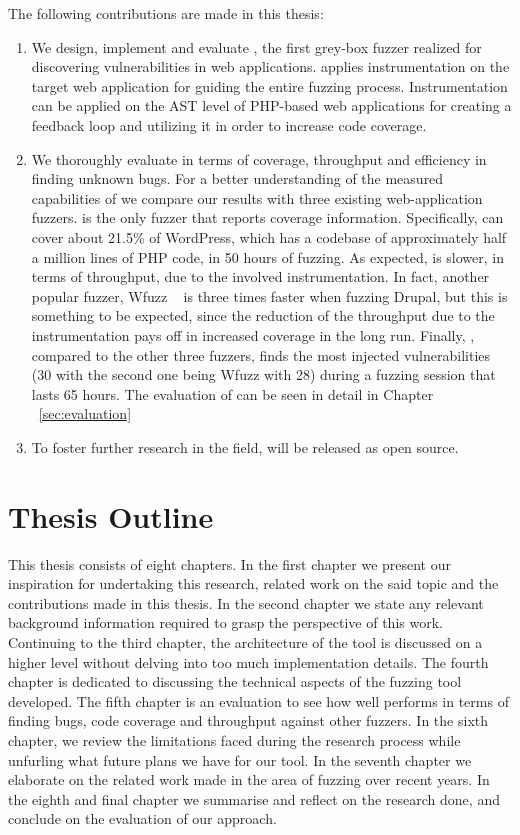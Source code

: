 The following contributions are made in this thesis:

\begin{enumerate}

\item We design, implement and evaluate \pname{}, the first grey-box fuzzer realized for discovering vulnerabilities in web applications. \pname{} applies instrumentation on the target web application for guiding the entire fuzzing process. Instrumentation can be applied on the AST level of PHP-based web applications for creating a feedback loop and utilizing it in order to increase code coverage.
\item We thoroughly evaluate \pname{} in terms of coverage, throughput and efficiency in finding unknown bugs. For a better understanding of the measured capabilities of \pname{} we compare our results with three existing web-application fuzzers. \pname{} is the only fuzzer that
reports coverage information. Specifically, \pname{} can cover about 21.5\% of WordPress, which has a codebase of approximately half a million lines of PHP code, in 50 hours of fuzzing. As expected, \pname{} is slower, in terms of throughput, due to the involved instrumentation. In fact, another popular fuzzer, Wfuzz ~\cite{wfuzz} is three times faster when fuzzing Drupal, but this is something to be expected, since the reduction of the throughput due to the instrumentation pays off in increased coverage in the long run. Finally, \pname{}, compared to the other three fuzzers, finds the most injected vulnerabilities (30 with the second one being Wfuzz with 28) during a fuzzing session that lasts 65 hours. The evaluation of \pname{} can be seen in detail in Chapter ~\ref{sec:evaluation}
\item To foster further research in the field, \pname{} will be released as open source.

\end{enumerate}

\section{Thesis Outline}
This thesis consists of eight chapters. In the first chapter we present our inspiration for undertaking this research, related work on the said topic and the contributions made in this thesis. In the second chapter we state any relevant background information required to grasp the perspective of this work. Continuing to the third chapter, the architecture of the tool is discussed on a higher level without delving into too much implementation details. The fourth chapter is dedicated to discussing the technical aspects of the fuzzing tool developed. The fifth chapter is an evaluation to see how well \pname{} performs in terms of finding bugs, code coverage and throughput against other fuzzers. In the sixth chapter, we review the limitations faced during the research process while unfurling what future plans we have for our tool. In the seventh chapter we elaborate on the related work made in the area of fuzzing over recent years. In the eighth and final chapter we summarise and reflect on the research done, and conclude on the evaluation of our approach.
